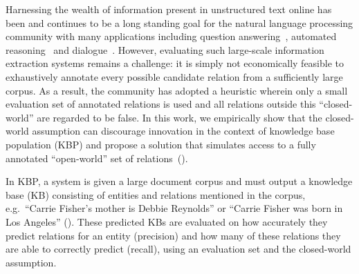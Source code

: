 Harnessing the wealth of information present in unstructured text online has been and continues to be a long standing goal for the natural language processing community with many applications including question answering~\citep{berant2013freebase, fader2014open}, automated reasoning~\citep{kalyanpur2012structured} and dialogue~\citep{lee2015conversational,han2015exploiting}.
%
However, evaluating such large-scale information extraction systems remains a challenge:
it is simply not economically feasible to exhaustively annotate every possible candidate relation from a sufficiently large corpus.
As a result, the community has adopted a heuristic wherein only a small evaluation set of annotated relations is used and all relations outside this ``closed-world'' are regarded to be false.
In this work, we empirically show that the closed-world assumption can discourage innovation in the context of knowledge base population (KBP) and propose a solution that simulates access to a fully annotated ``open-world'' set of relations~().

In KBP, a system is given a large document corpus and must output a knowledge base (KB) consisting of entities and relations mentioned in the corpus, e.g.\ ``Carrie Fisher's mother is Debbie Reynolds'' or ``Carrie Fisher was born in Los Angeles'' (). %
These predicted KBs are evaluated on how accurately they predict relations for an entity (precision)  and how many of these relations they are able to correctly predict (recall), using an evaluation set and the closed-world assumption. %

